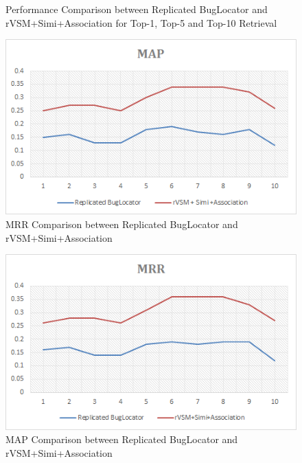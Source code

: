\documentclass[conference]{IEEEtran}
\begin{document}
\begin{figure}
	\caption {Performance Comparison between Replicated BugLocator and rVSM+Simi+Association for Top-1, Top-5 and Top-10 Retrieval}
	\label{fig:RepBL+AssoTopK}
\end{figure}
\begin{figure}
	\centering
	\includegraphics[scale=0.70]{RBL+rSAssoTop-MRR}
	\caption {MRR Comparison between Replicated BugLocator and rVSM+Simi+Association}
	\label{fig:RepBL+AssoTop-MRR}
\end{figure}
\begin{figure}
	\centering
	\includegraphics[scale=0.70]{RBL+rSAssoTop-MAP}
	\caption {MAP Comparison between Replicated BugLocator and rVSM+Simi+Association}
	\label{fig:RepBL+AssoTop-MAP}
\end{figure}
\end{document}
